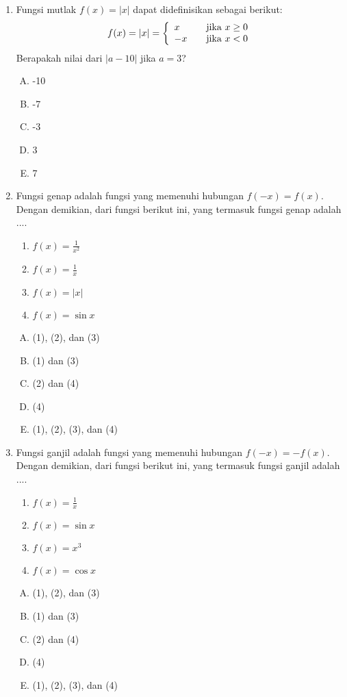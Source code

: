 \documentclass[fleqn, a4paper, 12pt]{article} %
\begin{document}
\begin{enumerate}
		\item Fungsi mutlak $f(x) = |x|$ dapat didefinisikan sebagai berikut:
			\[f(x) = |x| =  \left\{ 
				\begin{array}{l l}
					x & \quad \text{jika $x \geq 0$}\\
					-x & \quad \text{jika $x < 0$}
				\end{array} \right.\]
			Berapakah nilai dari $|a - 10|$ jika $a = 3$?
			\begin{enumerate}[(A)]
				\item -10
				\item -7
				\item -3
				\item 3
				\item 7
			\end{enumerate}
		\item Fungsi genap adalah fungsi yang memenuhi hubungan $f(-x) = f(x)$. Dengan demikian, dari fungsi berikut ini, yang termasuk fungsi genap adalah ....
			\begin{enumerate}[(1)]				
				\item $f(x) = \frac{1}{x^2}$
				\item $f(x) = \frac{1}{x}$
				\item $f(x) = |x|$
				\item $f(x) = \sin x$
			\end{enumerate}
			\begin{enumerate}[(A)]
				\item (1), (2), dan (3)
				\item (1) dan (3)
				\item (2) dan (4)
				\item (4)
				\item (1), (2), (3), dan (4)
			\end{enumerate}
		
		\newpage
		
		\item Fungsi ganjil adalah fungsi yang memenuhi hubungan $f(-x) = -f(x)$. Dengan demikian, dari fungsi berikut ini, yang termasuk fungsi ganjil adalah ....
			\begin{enumerate}[(1)]			
				\item $f(x) = \frac{1}{x}$
				\item $f(x) = \sin x$
				\item $f(x) = x^3$
				\item $f(x) = \cos x$
			\end{enumerate}
			\begin{enumerate}[(A)]
				\item (1), (2), dan (3)
				\item (1) dan (3)
				\item (2) dan (4)
				\item (4)
				\item (1), (2), (3), dan (4)
			\end{enumerate}			
	\end{enumerate}
\end{document}
